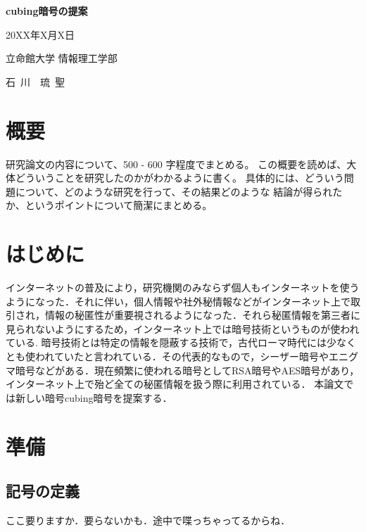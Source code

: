 \documentclass{jsarticle}
\begin{document}
\thispagestyle{empty}
\begin{center}
\vspace*{4.5cm}
{\huge\bf cubing暗号の提案}
\vspace*{3cm}

{\large 20XX年X月X日}
\vspace*{3cm}

{\large 立命館大学 情報理工学部}
\vspace*{5mm}

{\Large 石~川~~琉~聖}
\end{center}
\newpage 

\setcounter{page}{1}

\section*{概要}

研究論文の内容について、500 - 600 字程度でまとめる。
この概要を読めば、大体どういうことを研究したのかがわかるように書く。
具体的には、どういう問題について、どのような研究を行って、その結果どのような
結論が得られたか、というポイントについて簡潔にまとめる。

\newpage

\tableofcontents
\clearpage

\section{はじめに}

インターネットの普及により，研究機関のみならず個人もインターネットを使うようになった．それに伴い，個人情報や社外秘情報などがインターネット上で取引され，情報の秘匿性が重要視されるようになった．それら秘匿情報を第三者に見られないようにするため，インターネット上では暗号技術というものが使われている.
暗号技術とは特定の情報を隠蔽する技術で，古代ローマ時代には少なくとも使われていたと言われている．\cite{caesar}その代表的なもので，シーザー暗号やエニグマ暗号などがある．現在頻繁に使われる暗号としてRSA暗号やAES暗号があり，インターネット上で殆ど全ての秘匿情報を扱う際に利用されている．
本論文では新しい暗号cubing暗号を提案する．\\

\section{準備}
\subsection{記号の定義}
ここ要りますか．要らないかも．途中で喋っちゃってるからね．
\end{document}
